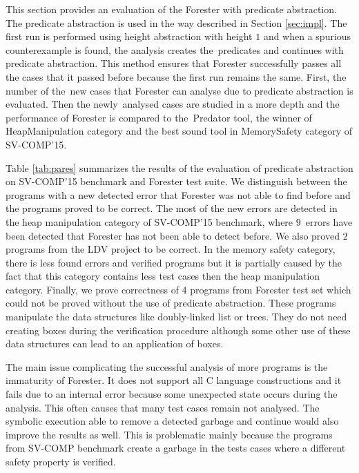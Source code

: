 This section provides an evaluation of the Forester with predicate abstraction.
The predicate abstraction is used in the way described in Section \ref{sec:impl}.
The first run is performed using height abstraction with height $1$ and when a spurious
counterexample is found, the analysis creates the~predicates and continues with
predicate abstraction.
This method ensures that Forester successfully passes all the cases that it passed
before because the first run remains the same.
First, the number of the~new cases that Forester can analyse due to
predicate abstraction is evaluated.
Then the newly~analysed cases are studied in a more depth and
the performance of Forester is compared to the~Predator tool, the winner of HeapManipulation category
and the best sound tool in MemorySafety category of SV-COMP'15.

Table \ref{tab:pares} summarizes the results of the evaluation
of predicate abstraction on SV-COMP'15 benchmark and Forester test suite.
We distinguish between the programs with a new detected error
that Forester was not able to find before and the programs proved to be correct.
The most of the new errors are detected in the heap manipulation category of SV-COMP'15
benchmark, where $9$~errors have been detected that Forester
has not been able to detect before.
We also proved $2$ programs from the LDV project to be correct.
In the memory safety category, there is less found errors and verified programs
but it is partially caused by the fact that this category contains less test cases
then the heap manipulation category.
Finally, we prove correctness of $4$ programs from Forester test set
which could not be proved without the use of predicate abstraction.
These programs manipulate the data structures like doubly-linked list
or trees.
They do not need creating boxes during the verification procedure although
some other use of these data structures can lead to an application of boxes.

The main issue complicating the successful analysis of
more programs is the immaturity of Forester.
It does not support all C language constructions
and it fails due to an internal error because some unexpected
state occurs during the analysis.
This often causes that many test cases remain not analysed.
The symbolic execution able to remove a detected
garbage and continue would also improve the results as well.
This is problematic mainly because the programs from SV-COMP
benchmark create a garbage in the tests cases where
a different safety property is verified.


